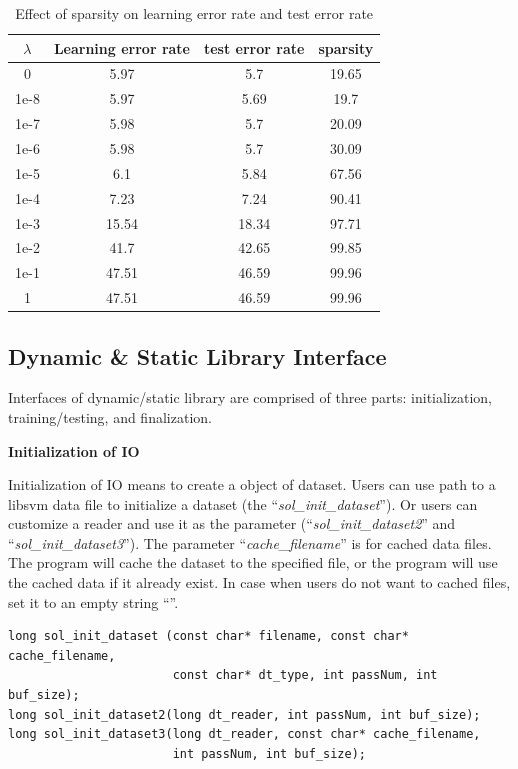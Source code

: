 \documentclass[11pt,a4paper]{article}
\begin{document}
\begin{table}[!h]
    \label{tbl:lambda_effect}
    \centering
    \begin{tabular}{|c|c|c|c|}
        \hline
        $\lambda$ & Learning error rate & test error rate & sparsity \\
        \hline
        0 & 5.97 & 5.7 & 19.65 \\
        1e-8 & 5.97 & 5.69 & 19.7 \\
        1e-7 & 5.98 & 5.7 & 20.09 \\
        1e-6 & 5.98 & 5.7 & 30.09 \\
        1e-5 & 6.1 & 5.84 & 67.56 \\
        1e-4 & 7.23 & 7.24 & 90.41 \\
        1e-3 & 15.54 & 18.34 & 97.71 \\
        1e-2 & 41.7 & 42.65 & 99.85\\
        1e-1 & 47.51 & 46.59 & 99.96 \\
        1 & 47.51 & 46.59 & 99.96 \\
        \hline
    \end{tabular}
    \caption{Effect of sparsity on learning error rate and test error rate}
    \label{tab:effect_lambda}
\end{table}

\subsection{Dynamic \& Static Library Interface}
Interfaces of dynamic/static library are comprised of three parts:
initialization, training/testing, and finalization.

\hspace{-5mm}\textbf{Initialization of IO}
\vspace{2mm}

Initialization of IO means to create a object of dataset. Users can use 
path to a libsvm data file to initialize a dataset (the ``\emph{sol\_init\_dataset}''). Or users can customize a reader
and use it as the parameter (``\emph{sol\_init\_dataset2}'' and
``\emph{sol\_init\_dataset3}''). The parameter ``\emph{cache\_filename}'' is for
cached data files. The program will cache the dataset to the specified file, or
the program will use the cached data if it already exist. In case when users do
not want to cached files, set it to an empty string ``''.

\lstset{language=C++}
\begin{lstlisting}
long sol_init_dataset (const char* filename, const char* cache_filename, 
                       const char* dt_type, int passNum, int buf_size);
long sol_init_dataset2(long dt_reader, int passNum, int buf_size);
long sol_init_dataset3(long dt_reader, const char* cache_filename, 
                       int passNum, int buf_size);
\end{lstlisting}
\end{document}
